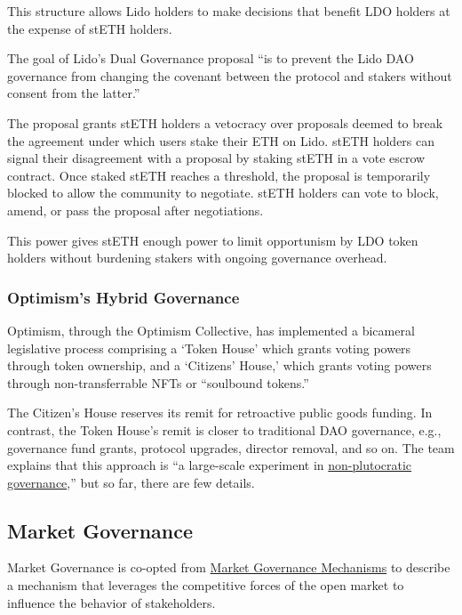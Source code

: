 \documentclass[
]{article}
\begin{document}
This structure allows Lido holders to make decisions that benefit LDO
holders at the expense of stETH holders.

The goal of Lido's Dual Governance proposal ``is to prevent the Lido DAO
governance from changing the covenant between the protocol and stakers
without consent from the latter.''

The proposal grants stETH holders a vetocracy over proposals deemed to
break the agreement under which users stake their ETH on Lido. stETH
holders can signal their disagreement with a proposal by staking stETH
in a vote escrow contract. Once staked stETH reaches a threshold, the
proposal is temporarily blocked to allow the community to negotiate.
stETH holders can vote to block, amend, or pass the proposal after
negotiations.

This power gives stETH enough power to limit opportunism by LDO token
holders without burdening stakers with ongoing governance overhead.

\hypertarget{optimisms-hybrid-governance}{%
\subsubsection{Optimism's Hybrid
Governance}\label{optimisms-hybrid-governance}}

Optimism, through the Optimism Collective, has implemented a bicameral
legislative process comprising a `Token House' which grants voting
powers through token ownership, and a `Citizens' House,' which grants
voting powers through non-transferrable NFTs or ``soulbound tokens.''

The Citizen's House reserves its remit for retroactive public goods
funding. In contrast, the Token House's remit is closer to traditional
DAO governance, e.g., governance fund grants, protocol upgrades,
director removal, and so on. The team explains that this approach is ``a
large-scale experiment in
\href{https://vitalik.ca/general/2021/08/16/voting3.html}{non-plutocratic
governance},'' but so far, there are few details.

\hypertarget{market-governance}{%
\subsection{Market Governance}\label{market-governance}}

Market Governance is co-opted from
\href{https://en.wikipedia.org/wiki/Market_governance_mechanism}{Market
Governance Mechanisms} to describe a mechanism that leverages the
competitive forces of the open market to influence the behavior of
stakeholders.
\end{document}
